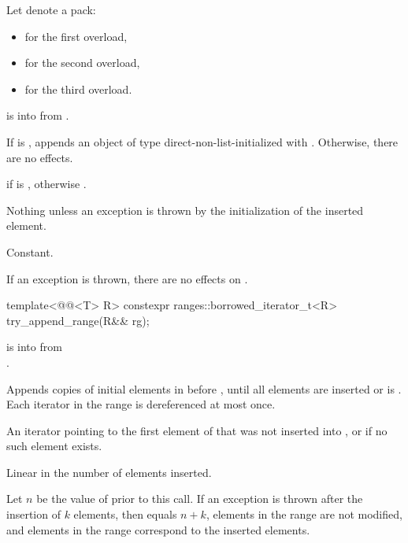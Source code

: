\begin{itemdescr}
\pnum
Let  denote a pack:
\begin{itemize}
\item {} for the first overload,
\item {} for the second overload,
\item {} for the third overload.
\end{itemize}

\pnum
\expects
{} is 
into  from .

\pnum
\effects
If  is ,
appends an object of type 
direct-non-list-initialized with .
Otherwise, there are no effects.

\pnum
\returns
{} if  is ,
otherwise .

\pnum
\throws
Nothing unless an exception is thrown by the initialization of the inserted element.

\pnum
\complexity
Constant.

\pnum
\remarks
If an exception is thrown, there are no effects on .
\end{itemdescr}

%
\begin{itemdecl}
template<@@<T> R>
  constexpr ranges::borrowed_iterator_t<R> try_append_range(R&& rg);
\end{itemdecl}

\begin{itemdescr}
\pnum
\expects
{} is 
into  from\\.

\pnum
\effects
Appends copies of initial elements in  before ,
until all elements are inserted or  is .
Each iterator in the range  is dereferenced at most once.

\pnum
\returns
An iterator pointing to the first element of 
that was not inserted into ,
or  if no such element exists.

\pnum
\complexity
Linear in the number of elements inserted.

\pnum
\remarks
Let $n$ be the value of  prior to this call.
If an exception is thrown after the insertion of $k$ elements, then
 equals $n + k$,
elements in the range  are not modified, and
elements in the range  correspond to
the inserted elements.
\end{itemdescr}

